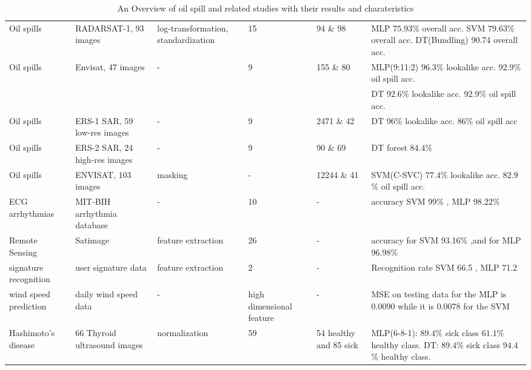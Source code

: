 \begin{table*}[t]
\begin{adjustbox}{width=\textwidth,totalheight=\textheight,keepaspectratio}
\begin{tabular}{*{6}{|l|}}
    Oil spills\cite{Xu201414} &  RADARSAT-1, 93 images & log-transformation, standardization & 15 & 94  \& 98  & MLP $75.93$\% overall acc. SVM $79.63$\% overall acc. DT(Bundling) 90.74 overall acc.\\
    
    Oil spills\cite{Mera201472} &  Envisat, 47 images & - & 9 & 155  \& 80  & MLP(9:11:2) $96.3$\% lookalike acc. $92.9$\% oil spill acc. \\
    & & & & & DT $92.6$\% lookalike acc. $92.9$\% oil spill acc. \\
    
    Oil spills\cite{Delfrate1996} &  ERS-1 SAR, 59 low-res images & - & 9 & 2471 \& 42  & DT $96$\% lookalike acc. $86$\% oil spill acc\\
    
    Oil spills\cite{Topouzelis201268} &  ERS-2 SAR, 24 high-res images & - & 9 & 90  \& 69  & DT forest $84.4$\%\\ 
    
    Oil spills\cite{brekke2008classifiers} & ENVISAT, 103 images & masking & - & 12244 \& 41  & SVM(C-SVC) $77.4$\% lookalike acc. $82.9$\% oil spill acc.\\

    ECG arrhythmias\cite{Moavenian20103088} & MIT-BIH arrhythmia database & - & 10 & - & accuracy SVM 99\% , MLP 98.22\% \\

    Remote Sensing\cite{Zanaty2012177} & Satimage & feature extraction & 26& - & accuracy for SVM 93.16\% ,and for MLP 96.98\%\\
    
    signature recognition\cite{FriasMartinez2006693} & user signature data &feature extraction& 2 & - & Recognition rate SVM 66.5  , MLP 71.2\\
    wind speed prediction\cite{Mohandes2004939}& daily wind speed data & - &high dimensional feature & - & MSE on testing data for the MLP is 0.0090 while it is 0.0078 for the SVM\\
    
    Hashimoto's disease\cite{Omiotek201340} &  66 Thyroid ultrasound images & normalization & 59 & 54 healthy and 85 sick & MLP(6-8-1): $89.4$\% sick class $61.1$\% healthy class. DT: $89.4$\% sick class $94.4$\% healthy class. \\
    
    \bottomrule[1.5pt]
    
\end{tabular}
\end{adjustbox}
\caption{\footnotesize{An Overview of oil spill and related studies with their results and charateristics}}
\label{fig:table}
\end{table*}

